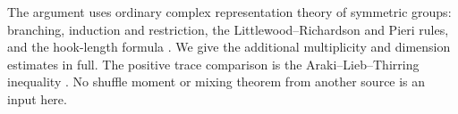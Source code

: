The argument uses ordinary complex representation theory of symmetric groups: branching, induction and restriction, the Littlewood--Richardson and Pieri rules, and the hook-length formula \cite{James1978,Sagan2001,Stanley1999}. We give the additional multiplicity and dimension estimates in full. The positive trace comparison is the Araki--Lieb--Thirring inequality \cite{araki1990}. No shuffle moment or mixing theorem from another source is an input here.
